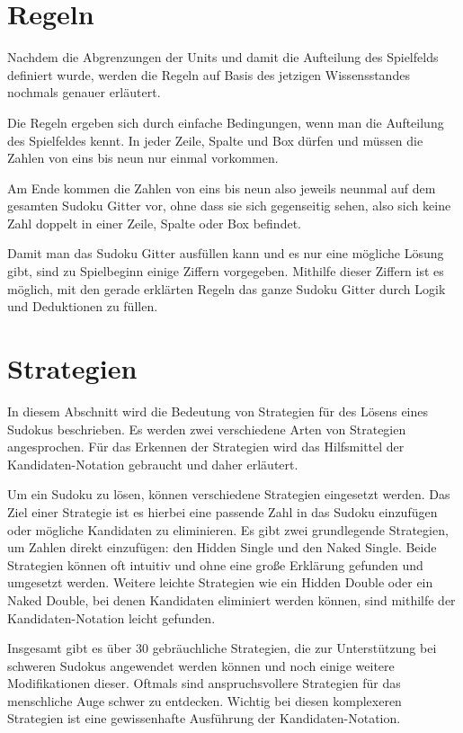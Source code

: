 \section{Regeln}
Nachdem die Abgrenzungen der Units und damit die Aufteilung des Spielfelds definiert wurde, werden die Regeln auf Basis des jetzigen Wissensstandes nochmals genauer erläutert.

Die Regeln ergeben sich durch einfache Bedingungen, wenn man die Aufteilung des Spielfeldes kennt. In jeder Zeile, Spalte und Box dürfen und müssen die Zahlen von eins bis neun nur einmal vorkommen.

Am Ende kommen die Zahlen von eins bis neun also jeweils neunmal auf dem gesamten Sudoku Gitter vor, ohne dass sie sich gegenseitig sehen, also sich keine Zahl doppelt in einer Zeile, Spalte oder Box befindet.

Damit man das Sudoku Gitter ausfüllen kann und es nur eine mögliche Lösung gibt, sind zu Spielbeginn einige Ziffern vorgegeben. Mithilfe dieser Ziffern ist es möglich, mit den gerade erklärten Regeln das ganze Sudoku Gitter durch Logik und Deduktionen zu füllen. \cite{sudopedia_2022} \cite{martin}

\section{Strategien}
In diesem Abschnitt wird die Bedeutung von Strategien für des Lösens eines Sudokus beschrieben. Es werden zwei verschiedene Arten von Strategien angesprochen. Für das Erkennen der Strategien wird das Hilfsmittel der Kandidaten-Notation gebraucht und daher erläutert.

Um ein Sudoku zu lösen, können verschiedene Strategien eingesetzt werden. Das Ziel einer Strategie ist es hierbei eine passende Zahl in das Sudoku einzufügen oder mögliche Kandidaten zu eliminieren. Es gibt zwei grundlegende Strategien, um Zahlen direkt einzufügen: den Hidden Single und den Naked Single. Beide Strategien können oft intuitiv und ohne eine große Erklärung gefunden und umgesetzt werden. Weitere leichte Strategien wie ein Hidden Double oder ein Naked Double, bei denen Kandidaten eliminiert werden können, sind mithilfe der Kandidaten-Notation leicht gefunden.

Insgesamt gibt es über 30 gebräuchliche Strategien, die zur Unterstützung bei schweren Sudokus angewendet werden können und noch einige weitere Modifikationen dieser. Oftmals sind anspruchsvollere Strategien für das menschliche Auge schwer zu entdecken. Wichtig bei diesen komplexeren Strategien ist eine gewissenhafte Ausführung der Kandidaten-Notation. \cite{martin} \cite[9]{zambon2015sudoku}

